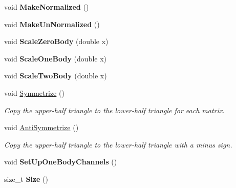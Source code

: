 \begin{DoxyCompactItemize}
\item 
\hypertarget{classOperator_a64c6b761468d1983610c5c9d26f84222}{void {\bfseries Make\-Normalized} ()}\label{classOperator_a64c6b761468d1983610c5c9d26f84222}

\item 
\hypertarget{classOperator_a93511274ce2cc52d0facb2a38fae91af}{void {\bfseries Make\-Un\-Normalized} ()}\label{classOperator_a93511274ce2cc52d0facb2a38fae91af}

\item 
\hypertarget{classOperator_a3a25803bc77344396f2dd0e75d2a020d}{void {\bfseries Scale\-Zero\-Body} (double x)}\label{classOperator_a3a25803bc77344396f2dd0e75d2a020d}

\item 
\hypertarget{classOperator_a5466cc965277b75b14b60918f4d652ab}{void {\bfseries Scale\-One\-Body} (double x)}\label{classOperator_a5466cc965277b75b14b60918f4d652ab}

\item 
\hypertarget{classOperator_af1f244c4856d11c21f94b6c6cd24a555}{void {\bfseries Scale\-Two\-Body} (double x)}\label{classOperator_af1f244c4856d11c21f94b6c6cd24a555}

\item 
\hypertarget{classOperator_a98d4075d734523186162492a4a45b420}{void \hyperlink{classOperator_a98d4075d734523186162492a4a45b420}{Symmetrize} ()}\label{classOperator_a98d4075d734523186162492a4a45b420}

\begin{DoxyCompactList}\small\item\em Copy the upper-\/half triangle to the lower-\/half triangle for each matrix. \end{DoxyCompactList}\item 
\hypertarget{classOperator_a21a37daa051c248109153e6502b8280f}{void \hyperlink{classOperator_a21a37daa051c248109153e6502b8280f}{Anti\-Symmetrize} ()}\label{classOperator_a21a37daa051c248109153e6502b8280f}

\begin{DoxyCompactList}\small\item\em Copy the upper-\/half triangle to the lower-\/half triangle with a minus sign. \end{DoxyCompactList}\item 
\hypertarget{classOperator_ad6168f16f6c0b2cf70a1fc0676e70523}{void {\bfseries Set\-Up\-One\-Body\-Channels} ()}\label{classOperator_ad6168f16f6c0b2cf70a1fc0676e70523}

\item 
\hypertarget{classOperator_a953ce26eec380dd538bd288009f4643e}{size\-\_\-t {\bfseries Size} ()}\label{classOperator_a953ce26eec380dd538bd288009f4643e}


\end{DoxyCompactItemize}
